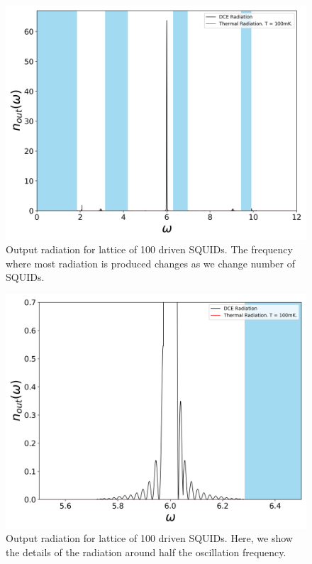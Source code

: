 %
\begin{figure}[h]
    \centering
    \includegraphics[width=\textwidth, keepaspectratio]{figures/results/100_SQUIDs_active_100mK.png}
    \caption{Output radiation for lattice of 100 driven SQUIDs. The frequency where most radiation is produced changes as we change number of SQUIDs.}
    \label{fig:100_SQUIDs_active}
\end{figure}

\clearpage
%
\begin{figure}[h]
    \centering
    \includegraphics[width=\textwidth, keepaspectratio]{figures/results/100_SQUIDs_active_100mK_zoom.png}
    \caption{Output radiation for lattice of 100 driven SQUIDs. Here, we show the details of the radiation around half the oscillation frequency.}
    \label{fig:100_SQUIDs_active_zoomed}
\end{figure}
\clearpage
%

